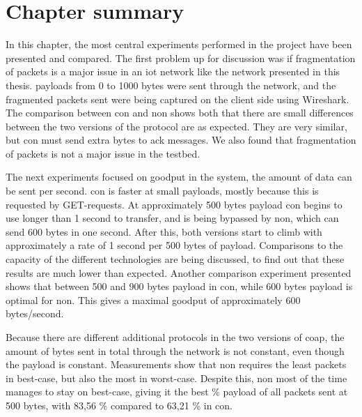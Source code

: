 \section{Chapter summary}

\noindent In this chapter, the most central experiments performed in the project have been presented and compared. The first problem up for discussion was if fragmentation of packets is a major issue in an \gls{iot} network like the network presented in this thesis. \Glspl{payload} from 0 to 1000 bytes were sent through the network, and the fragmented packets sent were being captured on the client side using Wireshark. The comparison between \gls{con} and \gls{non} shows both that there are small differences between the two versions of the protocol are as expected. They are very similar, but \gls{con} must send extra bytes to \gls{ack} messages. We also found that fragmentation of packets is not a major issue in the testbed. 

\noindent The next experiments focused on \gls{goodput} in the system, the amount of data can be sent per second. \gls{con} is faster at small \glspl{payload}, mostly because this is requested by GET-requests. At approximately 500 bytes \gls{payload} \gls{con} begins to use longer than 1 second to transfer, and is being bypassed by \gls{non}, which can send 600 bytes in one second. After this, both versions start to climb with approximately a rate of 1 second per 500 bytes of \gls{payload}. Comparisons to the capacity of the different technologies are being discussed, to find out that these results are much lower than expected. Another comparison experiment presented shows that between 500 and 900 bytes \gls{payload} in \gls{con}, while 600 bytes \gls{payload} is optimal for \gls{non}. This gives a maximal \gls{goodput} of approximately 600 bytes/second. 

\noindent Because there are different additional protocols in the two versions of \gls{coap}, the amount of bytes sent in total through the network is not constant, even though the \gls{payload} is constant. Measurements show that \gls{non} requires the least packets in best-case, but also the most in worst-case. Despite this, \gls{non} most of the time manages to stay on best-case, giving it the best \% payload of all packets sent at 500 bytes, with 83,56 \% compared to 63,21 \% in \gls{con}.   


